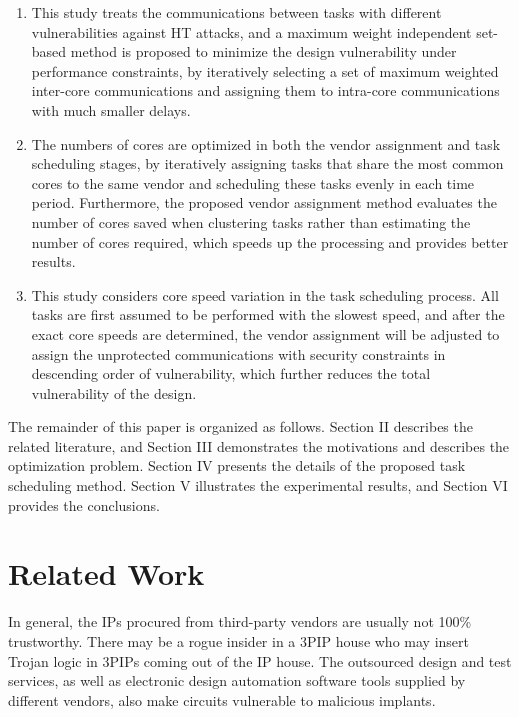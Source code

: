 \documentclass[10pt,journal, compsoc]{IEEEtran}
\begin{document}
\begin{enumerate}

\item This study treats the communications between tasks with different vulnerabilities against HT attacks, and a maximum weight independent set-based method is proposed to minimize the design vulnerability under performance constraints, by iteratively selecting a set of maximum weighted inter-core communications and assigning them to intra-core communications with much smaller delays.

\item The numbers of cores are optimized in both the vendor assignment and task scheduling stages, by iteratively assigning tasks that share the most common cores to the same vendor and scheduling these tasks evenly in each time period. Furthermore, the proposed vendor assignment method evaluates the number of cores saved when clustering tasks rather than estimating the number of cores required, which speeds up the processing and provides better results.

\item This study considers core speed variation in the task scheduling process. All tasks are first assumed to be performed with the slowest speed, and after the exact core speeds are determined, the vendor assignment will be adjusted to assign the unprotected communications with security constraints in descending order of vulnerability, which further reduces the total vulnerability of the design.

\end{enumerate}



The remainder of this paper is organized as follows. Section II describes the related literature, and Section III demonstrates the motivations and describes the optimization problem. Section IV presents the details of the proposed task scheduling method. Section V illustrates the experimental results, and Section VI provides the conclusions.







\section{Related Work}




In general, the IPs procured from third-party vendors are usually not 100\% trustworthy. There may be a rogue insider in a 3PIP house who may insert Trojan logic in 3PIPs coming out of the IP house. The outsourced design and test services, as well as electronic design automation software tools supplied by different vendors, also make circuits vulnerable to malicious implants.%
\end{document}
